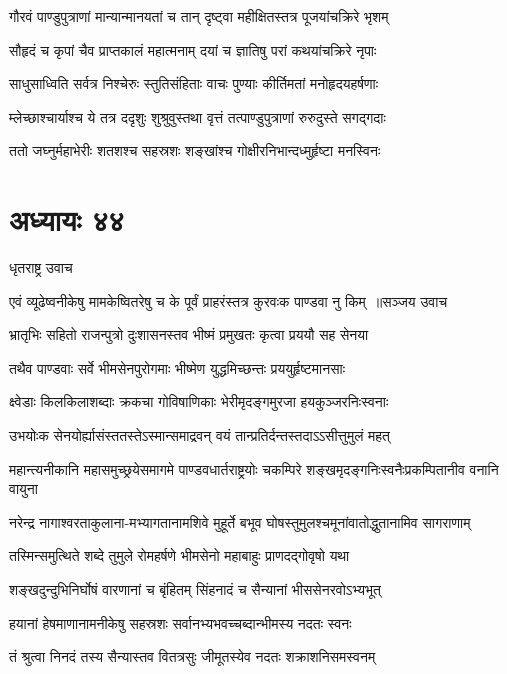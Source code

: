 \twolineshloka
{गौरवं पाण्डुपुत्राणां मान्यान्मानयतां च तान्}
{दृष्ट्वा महीक्षितस्तत्र पूजयांचक्रिरे भृशम्}


\twolineshloka
{सौहृदं च कृपां चैव प्राप्तकालं महात्मनाम्}
{दयां च ज्ञातिषु परां कथयांचक्रिरे नृपाः}


\twolineshloka
{साधुसाध्विति सर्वत्र निश्चेरुः स्तुतिसंहिताः}
{वाचः पुण्याः कीर्तिमतां मनोहृदयहर्षणाः}


\twolineshloka
{म्लेच्छाश्चार्याश्च ये तत्र ददृशुः शुश्रुवुस्तथा}
{वृत्तं तत्पाण्डुपुत्राणां रुरुदुस्ते सगद्गदाः}


\twolineshloka
{ततो जघ्नुर्महाभेरीः शतशश्च सहस्रशः}
{शङ्खांश्च गोक्षीरनिभान्दध्मुर्हृष्टा मनस्विनः}


\chapter{अध्यायः ४४}
\twolineshloka
{धृतराष्ट्र उवाच}
{}


\threelineshloka
{एवं व्यूढेष्वनीकेषु मामकेष्वितरेषु च}
{के पूर्वं प्राहरंस्तत्र कुरवःक पाण्डवा नु किम् ॥सञ्जय उवाच}
{}


\twolineshloka
{भ्रातृभिः सहितो राजन्पुत्रो दुःशासनस्तव}
{भीष्मं प्रमुखतः कृत्वा प्रययौ सह सेनया}


\twolineshloka
{तथैव पाण्डवाः सर्वे भीमसेनपुरोगमाः}
{भीष्मेण युद्धमिच्छन्तः प्रययुर्हृष्टमानसाः}


\twolineshloka
{क्ष्वेडाः किलकिलाशब्दाः क्रकचा गोविषाणिकाः}
{भेरीमृदङ्गमुरजा हयकुञ्जरनिःस्वनाः}


\twolineshloka
{उभयोःक सेनयोर्ह्यासंस्ततस्तेऽस्मान्समाद्रवन्}
{वयं तान्प्रतिर्दन्तस्तदाऽऽसीत्तुमुलं महत्}


\twolineshloka
{महान्त्यनीकानि महासमुच्छ्रयेसमागमे पाण्डवधार्तराष्ट्रयोः}
{चकम्पिरे शङ्खमृदङ्गनिःस्वनैःप्रकम्पितानीव वनानि वायुना}


\twolineshloka
{नरेन्द्र नागाश्वरताकुलाना-मभ्यागतानामशिवे मुहूर्ते}
{बभूव घोषस्तुमुलश्चमूनांवातोद्धुतानामिव सागराणाम्}


\twolineshloka
{तस्मिन्समुत्थिते शब्दे तुमुले रोमहर्षणे}
{भीमसेनो महाबाहुः प्राणदद्गोवृषो यथा}


\twolineshloka
{शङ्खदुन्दुभिनिर्घोषं वारणानां च बृंहितम्}
{सिंहनादं च सैन्यानां भीससेनरवोऽभ्यभूत्}


\twolineshloka
{हयानां हेषमाणानामनीकेषु सहस्रशः}
{सर्वानभ्यभवच्चब्दान्भीमस्य नदतः स्वनः}


\twolineshloka
{तं श्रुत्वा निनदं तस्य सैन्यास्तव वितत्रसुः}
{जीमूतस्येव नदतः शक्राशनिसमस्वनम्}


